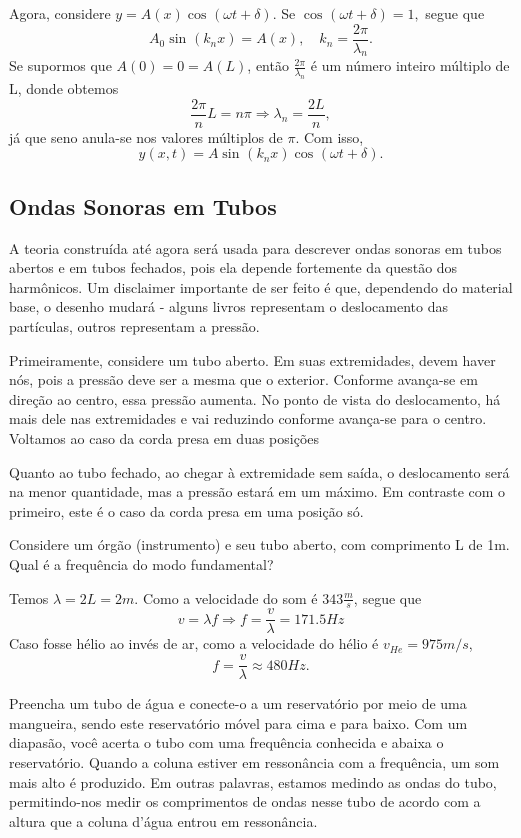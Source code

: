\documentclass[PhysicsII/physicsII_notes.tex]{subfiles}
\begin{document}
Agora, considere \(y = A(x)\cos^{}{(\omega t + \delta )}\). Se \(\cos^{}{(\omega t + \delta )}=1,\) segue que
\[
	A_{0}\sin^{}{(k_{n}x)} = A(x),\quad k_{n} = \frac{2\pi }{\lambda_{n}}.
\]
Se supormos que \(A(0) = 0 = A(L)\), então \(\frac{2\pi }{\lambda_{n}}\) é um número inteiro múltiplo de L, donde obtemos
\[
	\frac{2\pi }{n}L = n\pi \Rightarrow \lambda_{n} = \frac{2L}{n},
\]
já que seno anula-se nos valores múltiplos de \(\pi \). Com isso,
\[
	y(x, t) = A\sin^{}{(k_{n}x)}\cos^{}{(\omega t + \delta )}.
\]
\subsection{Ondas Sonoras em Tubos}
A teoria construída até agora será usada para descrever ondas sonoras em tubos abertos e em tubos fechados, pois ela depende fortemente
da questão dos harmônicos. Um disclaimer importante de ser feito é que, dependendo do material base, o desenho mudará - alguns livros representam
o deslocamento das partículas, outros representam a pressão.

Primeiramente, considere um tubo aberto. Em suas extremidades, devem haver nós, pois a pressão deve ser a mesma que o exterior. Conforme avança-se
em direção ao centro, essa pressão aumenta. No ponto de vista do deslocamento, há mais dele nas extremidades e vai reduzindo conforme avança-se para o
centro. Voltamos ao caso da corda presa em duas posições

Quanto ao tubo fechado, ao chegar à extremidade sem saída, o deslocamento será na menor quantidade, mas a pressão estará em um máximo.
Em contraste com o primeiro, este é o caso da corda presa em uma posição só.
\begin{example}
	Considere um órgão (instrumento) e seu tubo aberto, com comprimento L de 1m. Qual é a frequência do modo fundamental?

	Temos \(\lambda  = 2L = 2m. \) Como a velocidade do som é \(343 \frac{m}{s}\), segue que
	\[
		v = \lambda f \Rightarrow f = \frac{v}{\lambda } = 171.5 Hz
	\]
	Caso fosse hélio ao invés de ar, como a velocidade do hélio é \(v_{He} = 975m/s\),
	\[
		f = \frac{v}{\lambda } \approx 480Hz.
	\]
\end{example}
Preencha um tubo de água e conecte-o a um reservatório por meio de uma mangueira, sendo este reservatório móvel para cima e para baixo. Com um diapasão,
você acerta o tubo com uma frequência conhecida e abaixa o reservatório. Quando a coluna estiver em ressonância com a frequência, um som mais alto é produzido.
Em outras palavras, estamos medindo as ondas do tubo, permitindo-nos medir os comprimentos de ondas nesse tubo de acordo com a altura que a coluna d'água entrou em ressonância.
\end{document}
